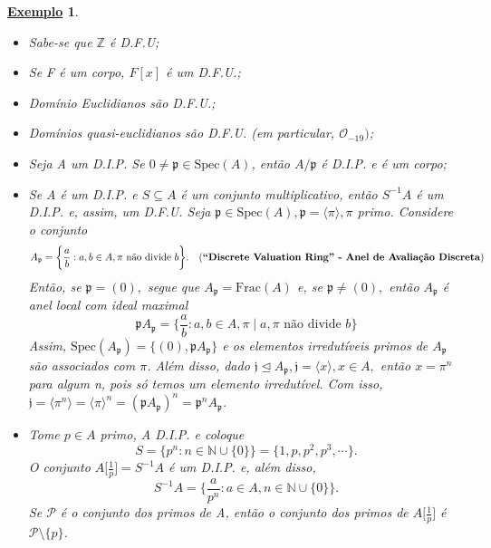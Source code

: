 \documentclass{article}
\newtheorem{example}{\underline{Exemplo}}
\begin{document}
    \begin{example}
      \begin{itemize}
        \item[1)] Sabe-se que \(\mathbb{Z}\) é D.F.U;
        \item[2)] Se F é um corpo, \(F[x]\) é um D.F.U.;
        \item[3)] Domínio Euclidianos são D.F.U.;
        \item[4)] Domínios quasi-euclidianos são D.F.U. (em particular, \(\mathcal{O}_{-19})\);
        \item[5)] Seja A um D.I.P. Se \(0\neq\mathfrak{p}\in \mathrm{Spec}(A)\), então \(A/\mathfrak{p}\) é D.I.P. e é um corpo;
        \item[6)] Se A é um D.I.P. e \(S\subseteq{A}\) é um conjunto multiplicativo, então \(S^{-1}A\) é um D.I.P. e, assim, um D.F.U. Seja \(\mathfrak{p}\in \mathrm{Spec}(A), \mathfrak{p} = \langle \pi  \rangle, \pi\) primo. Considere o conjunto 
          \[
            A_{\mathfrak{p}} = \biggl\{\frac{a}{b}: a, b \in A, \pi \text{ não divide } b\biggr\}.\quad \text{(\textbf{``Discrete Valuation Ring'' - Anel de Avaliação Discreta})}
          \]
          Então, se \(\mathfrak{p} = (0),\) segue que \(A_{\mathfrak{p}} = \mathrm{Frac}(A)\) e, se \(\mathfrak{p}\neq (0),\) então
          \(A_{\mathfrak{p}}\) é anel local com ideal maximal 
          \[
            \mathfrak{p}A_{\mathfrak{p}} = \biggl\{\frac{a}{b}: a,b\in A, \pi \mid a, \pi \text{ não divide } b\biggr\}
          \]
          Assim, \(\mathrm{Spec}(A_{\mathfrak{p}}) = \{(0), \mathfrak{p}A_{\mathfrak{p}}\}\) e os elementos irredutíveis primos de \(A_{\mathfrak{p}}\)
          são associados com \(\pi \). Além disso, dado \(\mathfrak{j}\trianglelefteq{A_{\mathfrak{p}}}, \mathfrak{j} = \langle x \rangle, x\in A,\) então
          \(x = \pi ^{n}\) para algum n, pois só temos um elemento irredutível. Com isso, \(\mathfrak{j} = \langle \pi ^{n} \rangle = \langle \pi  \rangle^{n} = (\mathfrak{p}A_{\mathfrak{p}})^{n} = \mathfrak{p}^{n}A_{\mathfrak{p}}\).
        \item[7)] Tome \(p\in A\) primo, A D.I.P. e coloque 
          \[
            S = \{p^{n}: n\in \mathbb{N}\cup \{0\}\} = \{1, p, p^{2}, p^{3}, \cdots\}.
          \]
          O conjunto \(A \biggl[\frac{1}{p}\biggr] = S^{-1}A\) é um D.I.P. e, além disso, 
          \[
            S^{-1}A = \biggl\{\frac{a}{p^{n}}:a\in A, n\in \mathbb{N}\cup\{0\}\biggr\}.
          \]
          Se \(\mathcal{P}\) é o conjunto dos primos de A, então o conjunto dos primos de \(A \biggl[\frac{1}{p}\biggr]\) é 
          \(\mathcal{P}\setminus{\{p\}}\).
      \end{itemize}
    \end{example}
\end{document}
